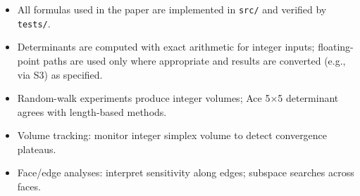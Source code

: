 \documentclass[
  10pt,
]{article}
\newcommand{\passthrough}[1]{#1}
\providecommand{\tightlist}{%
  \setlength{\itemsep}{0pt}\setlength{\parskip}{0pt}}
\begin{document}
\begin{itemize}
\tightlist
\item
  All formulas used in the paper are implemented in
  \passthrough{\lstinline!src/!} and verified by
  \passthrough{\lstinline!tests/!}.
\item
  Determinants are computed with exact arithmetic for integer inputs;
  floating-point paths are used only where appropriate and results are
  converted (e.g., via S3) as specified.
\item
  Random-walk experiments produce integer volumes; Ace 5×5 determinant
  agrees with length-based methods.
\item
  Volume tracking: monitor integer simplex volume to detect convergence
  plateaus.
\item
  Face/edge analyses: interpret sensitivity along edges; subspace
  searches across faces.
\end{itemize}
\end{document}
